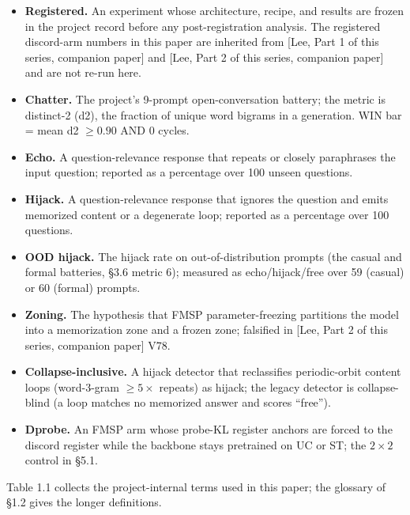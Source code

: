 \documentclass[11pt]{article}
\begin{document}
\begin{itemize}
  \item \textbf{Registered.} An experiment whose architecture, recipe, and results are frozen in the project record before any post-registration analysis. The registered discord-arm numbers in this paper are inherited from [Lee, Part 1 of this series, companion paper] and [Lee, Part 2 of this series, companion paper] and are not re-run here.
  \item \textbf{Chatter.} The project's 9-prompt open-conversation battery; the metric is distinct-2 (d2), the fraction of unique word bigrams in a generation. WIN bar = mean d2 $\geq 0.90$ AND 0 cycles.
  \item \textbf{Echo.} A question-relevance response that repeats or closely paraphrases the input question; reported as a percentage over 100 unseen questions.
  \item \textbf{Hijack.} A question-relevance response that ignores the question and emits memorized content or a degenerate loop; reported as a percentage over 100 questions.
  \item \textbf{OOD hijack.} The hijack rate on out-of-distribution prompts (the casual and formal batteries, \S3.6 metric 6); measured as echo/hijack/free over 59 (casual) or 60 (formal) prompts.
  \item \textbf{Zoning.} The hypothesis that FMSP parameter-freezing partitions the model into a memorization zone and a frozen zone; falsified in [Lee, Part 2 of this series, companion paper] V78.
  \item \textbf{Collapse-inclusive.} A hijack detector that reclassifies periodic-orbit content loops (word-3-gram $\geq 5\times$ repeats) as hijack; the legacy detector is collapse-blind (a loop matches no memorized answer and scores ``free'').
  \item \textbf{Dprobe.} An FMSP arm whose probe-KL register anchors are forced to the discord register while the backbone stays pretrained on UC or ST; the $2\times 2$ control in \S5.1.
\end{itemize}

Table 1.1 collects the project-internal terms used in this paper; the glossary of \S1.2 gives the longer definitions.
\end{document}
